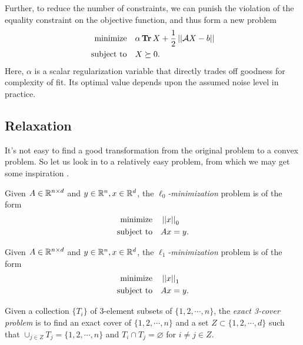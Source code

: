 \documentclass[11pt]{article}
\begin{document}
Further, to reduce the number of constraints, we can punish the violation of the equality constraint on the objective function, and thus form a new problem
\[\begin{aligned}
    \textnormal{minimize}\quad & \alpha\operatorname{\mathbf{Tr}} X+\frac12\left|\left|\mathcal AX-b\right|\right|\\
    \textnormal{subject to}\quad & X\succeq 0.
\end{aligned}\]
Here, \(\alpha\) is a scalar regularization variable that directly trades off goodness for complexity of fit. Its optimal value depends upon the assumed noise level in practice.

\subsection{Relaxation}

It's not easy to find a good transformation from the original problem to a convex problem. So let us look in to a relatively easy problem, from which we may get some inspiration \cite{horstmeyer2015solving}.

\begin{definition}
    Given \(A\in\mathbb R^{n\times d}\) and \(y\in\mathbb R^n,x\in\mathbb R^d\), the \emph{\(\ell_0\)-minimization} problem is of the form
    \[\begin{aligned}
        \textnormal{minimize}\quad & \left|\left|x\right|\right|_0\\
        \textnormal{subject to}\quad & Ax=y.
    \end{aligned}\]
\end{definition}

\begin{definition}
    Given \(A\in\mathbb R^{n\times d}\) and \(y\in\mathbb R^n,x\in\mathbb R^d\), the \emph{\(\ell_1\)-minimization} problem is of the form
    \[\begin{aligned}
        \textnormal{minimize}\quad & \left|\left|x\right|\right|_1\\
        \textnormal{subject to}\quad & Ax=y.
    \end{aligned}\]
\end{definition}

\begin{problem}\label{prb:exact-three-cover}
    Given a collection \(\{T_i\}\) of 3-element subsets of \(\{1,2,\cdots,n\}\), the \emph{exact 3-cover problem} is to find an exact cover of \(\{1,2,\cdots,n\}\) and a set \(Z \subset \{1,2,\cdots,d\}\) such that \(\cup_{j \in Z}T_j = \{1,2,\cdots,n\}\) and \(T_i \cap T_j = \varnothing\) for \(i\neq j\in Z\).
\end{problem}
\end{document}
